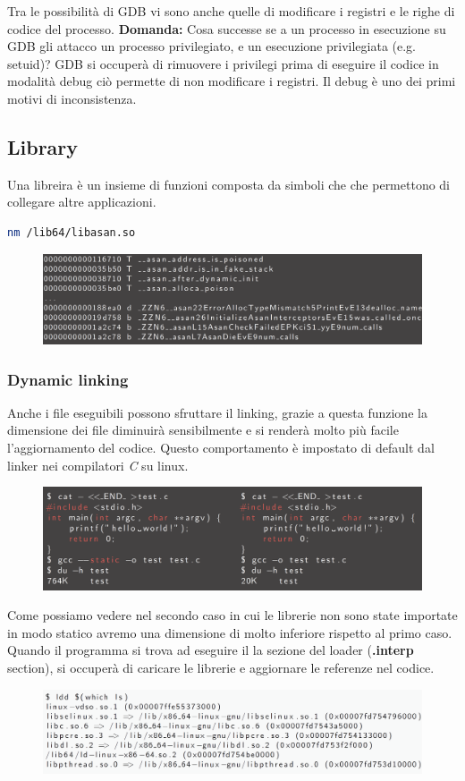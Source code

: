 Tra le possibilità di GDB vi sono anche quelle di modificare i registri e le righe di codice del processo.
\textbf{Domanda:} Cosa successe se a un processo in esecuzione su GDB gli attacco un processo privilegiato, e un esecuzione privilegiata (e.g. setuid)?
GDB si occuperà di rimuovere i privilegi prima di eseguire il codice in modalità debug ciò permette di non modificare i registri. Il debug è uno dei primi motivi di inconsistenza.

\subsection{Library}
Una libreira è un insieme di funzioni composta da simboli che che permettono di collegare altre applicazioni.
\begin{lstlisting}[language=bash]
    nm /lib64/libasan.so
\end{lstlisting}
\begin{figure}[h!]
    \centering
    \includegraphics[width=.5\linewidth]{res/library_1.png}
    \caption{}
\end{figure}

\subsubsection{Dynamic linking}

Anche i file eseguibili possono sfruttare il linking, grazie a questa funzione la dimensione dei file diminuirà sensibilmente e si renderà molto più facile l'aggiornamento del codice.
Questo comportamento è impostato di default dal linker nei compilatori \textit{C} su linux.
\begin{figure}[h!]
    \centering
    \includegraphics[width=.5\linewidth]{res/linking_2.png}
    \caption{}
\end{figure}
Come possiamo vedere nel secondo caso in cui le librerie non sono state importate in modo statico avremo una dimensione di molto inferiore rispetto al primo caso.
Quando il programma si trova ad eseguire il la sezione del loader (\textbf{.interp} section), si occuperà di caricare le librerie e aggiornare le referenze nel codice.
\begin{figure}[h!]
    \centering
    \includegraphics[width=.5\linewidth]{res/linking_3.png}
    \caption{}
\end{figure}

